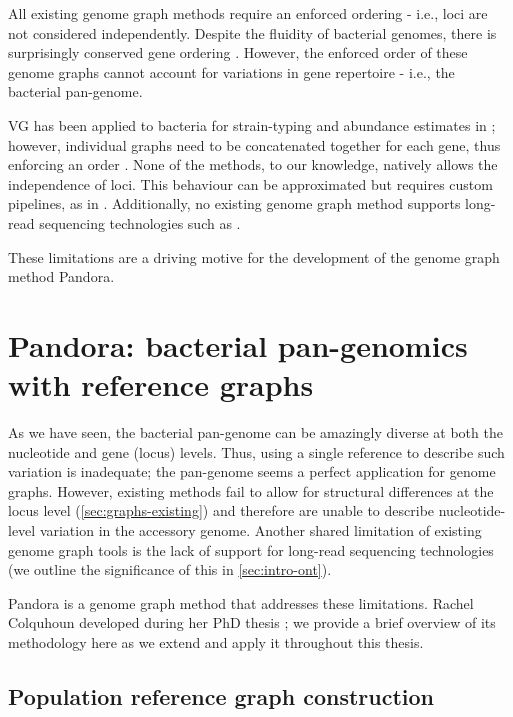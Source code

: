 \noindent
All existing genome graph methods require an enforced ordering - i.e., loci are not considered independently. Despite the fluidity of bacterial genomes, there is surprisingly conserved gene ordering \cite{Tamames2001,Rocha2008}. However, the enforced order of these genome graphs cannot account for variations in gene repertoire - i.e., the bacterial pan-genome. 

VG has been applied to bacteria for strain-typing and abundance estimates in \ecoli{}; however, individual graphs need to be concatenated together for each gene, thus enforcing an order \cite{strainflair2021}. None of the methods, to our knowledge, natively allows the independence of loci. This behaviour can be approximated but requires custom pipelines, as in \cite{strainflair2021}. Additionally, no existing genome graph method supports long-read sequencing technologies such as \ont{}.

These limitations are a driving motive for the development of the genome graph method Pandora.

\section{Pandora: bacterial pan-genomics with reference graphs}
\label{sec:pandora-intro}

As we have seen, the bacterial pan-genome can be amazingly diverse at both the nucleotide and gene (locus) levels. Thus, using a single reference to describe such variation is inadequate; the pan-genome seems a perfect application for genome graphs. However, existing methods fail to allow for structural differences at the locus level (\autoref{sec:graphs-existing}) and therefore are unable to describe nucleotide-level variation in the accessory genome. Another shared limitation of existing genome graph tools is the lack of support for long-read sequencing technologies (we outline the significance of this in \autoref{sec:intro-ont}).

Pandora is a genome graph method that addresses these limitations. Rachel Colquhoun developed \pandora{} during her PhD thesis \cite{rachelthesis}; we provide a brief overview of its methodology here as we extend and apply it throughout this thesis.

\subsection{Population reference graph construction}
\label{sec:make_prg}

